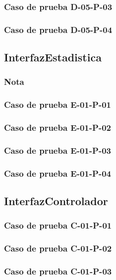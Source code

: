 \documentclass[10pt,a4paper]{article}
\begin{document}
			\subsubsection{Caso de prueba D-05-P-03}

			\subsubsection{Caso de prueba D-05-P-04}

	\subsection{InterfazEstadistica}
			\subsubsection{Nota}

			\subsubsection{Caso de prueba E-01-P-01}

			\subsubsection{Caso de prueba E-01-P-02}

			\subsubsection{Caso de prueba E-01-P-03}

			\subsubsection{Caso de prueba E-01-P-04}

	\subsection{InterfazControlador}
			\subsubsection{Caso de prueba C-01-P-01}

			\subsubsection{Caso de prueba C-01-P-02}

			\subsubsection{Caso de prueba C-01-P-03}
\end{document}
